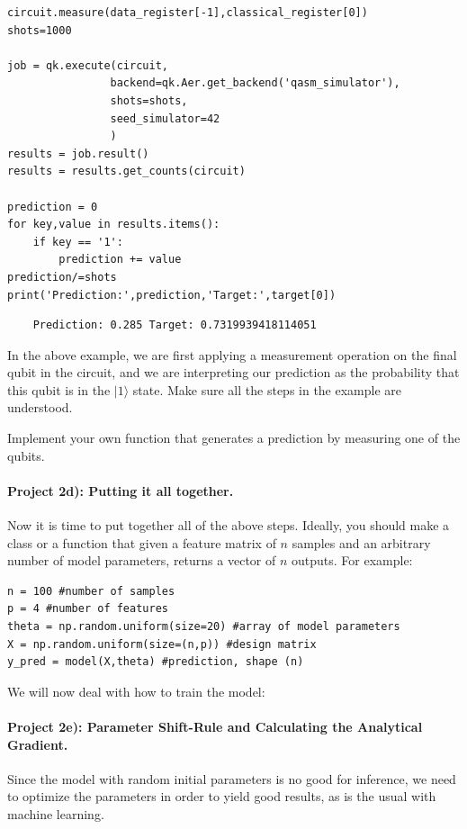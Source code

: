 \documentclass[%
oneside,                 %
final,                   %
10pt]{article}
\begin{document}
\begin{verbatim}
circuit.measure(data_register[-1],classical_register[0])
shots=1000

job = qk.execute(circuit,
                backend=qk.Aer.get_backend('qasm_simulator'),
                shots=shots,
                seed_simulator=42
                )
results = job.result()
results = results.get_counts(circuit)

prediction = 0
for key,value in results.items():
    if key == '1':
        prediction += value
prediction/=shots
print('Prediction:',prediction,'Target:',target[0])

\end{verbatim}



\begin{verbatim}
    Prediction: 0.285 Target: 0.7319939418114051

\end{verbatim}


In the above example, we are first applying a measurement operation on
the final qubit in the circuit, and we are interpreting our prediction
as the probability that this qubit is in the $\vert 1\rangle$ state. Make
sure all the steps in the example are understood.

Implement your own function that generates a prediction by measuring one of the qubits.

\paragraph{Project 2d): Putting it all together.}
Now it is time to put together all of the above steps. Ideally, you
should make a class or a function that given a feature matrix of $n$
samples and an arbitrary number of model parameters, returns a vector
of $n$ outputs. For example:







\begin{verbatim}
n = 100 #number of samples
p = 4 #number of features
theta = np.random.uniform(size=20) #array of model parameters
X = np.random.uniform(size=(n,p)) #design matrix
y_pred = model(X,theta) #prediction, shape (n)

\end{verbatim}


We will now deal with how to train the model:

\paragraph{Project 2e): Parameter Shift-Rule and Calculating the Analytical Gradient.}
Since the model with random initial parameters is no good for
inference, we need to optimize the parameters in order to yield good
results, as is the usual with machine learning.
\end{document}

